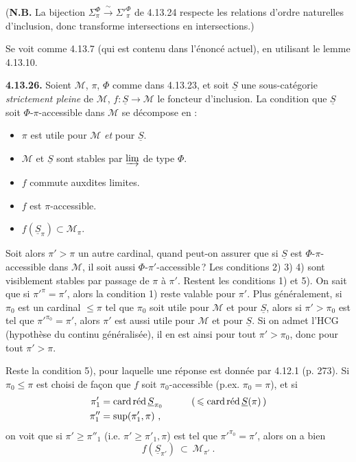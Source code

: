 \documentclass[11pt]{article}
\newcommand{\printedpage}[1]{\marginpar{\footnotesize p.~#1}}
\newcommand{\msp}[1]{\marginpar{\footnotesize [#1]}}
\newcommand{\cardred}{\mathop{\textup{card\,réd}}\nolimits}
\begin{document}
(\textbf{N.B.} La bijection $\Sigma^{\Phi}_{\pi}\xrightarrow{\ \sim\ }{\Sigma'}^{\Phi}_{\pi}$ de 4.13.24 respecte les relations d'ordre naturelles d'inclusion, donc transforme intersections en intersections.)

Se voit comme 4.13.7 (qui est contenu dans l'énoncé actuel), en utilisant le lemme 4.13.10.

\textbf{4.13.26.} Soient $\mathcal{M}$, $\pi$, $\Phi$ comme dans 4.13.23, et soit $\underline{S}$ une sous-catégorie \textit{strictement pleine} de $\mathcal{M}$, $f:\underline{S}\longrightarrow\mathcal{M}$ le foncteur d'inclusion. La condition que $\underline{S}$ soit $\Phi$-$\pi$-accessible dans $\mathcal{M}$ se décompose en :
\begin{itemize}[leftmargin=2.5em]
\item[1)] $\pi$ est utile pour $\mathcal{M}$ \textit{et} pour $\underline{S}$.
\item[2)] $\mathcal{M}$ et $\underline{S}$ sont stables par $\varinjlim$ de type $\Phi$.
\item[3)] $f$ commute auxdites limites.
\item[4)] $f$ est $\pi$-accessible.
\item[5)] $f(\underline{S}_\pi)\subset\mathcal{M}_\pi$.
\end{itemize}

\printedpage{132}
\msp{page 347}
Soit alors $\pi'>\pi$ un autre cardinal, quand peut-on assurer que si $\underline{S}$ est $\Phi$-$\pi$-accessible dans $\mathcal{M}$, il soit aussi $\Phi$-$\pi'$-accessible\,? Les conditions 2) 3) 4) sont visiblement stables par passage de $\pi$ à $\pi'$. Restent les conditions 1) et 5). On sait que si $\pi'^{\pi}=\pi'$, alors la condition 1) reste valable pour $\pi'$. Plus généralement, si $\pi_0$ est un cardinal $\leqslant\pi$ tel que $\pi_0$ soit utile pour $\mathcal{M}$ et pour $\underline{S}$, alors si $\pi'>\pi_0$ est tel que $\pi'^{\pi_0}=\pi'$, alors $\pi'$ est aussi utile pour $\mathcal{M}$ et pour $\underline{S}$. Si on admet l'HCG (hypothèse du continu généralisée), il en est ainsi pour tout $\pi'>\pi_0$, donc pour tout $\pi'>\pi$.

Reste la condition 5), pour laquelle une réponse est donnée par 4.12.1 (p. 273). Si $\pi_0\leqslant\pi$ est choisi de façon que $f$ soit $\pi_0$-accessible (p.ex. $\pi_0=\pi$), et si
\[
\begin{aligned}
\pi'_1 &= \cardred\underline{S}_{\pi_0} \qquad\quad (\,\leqslant\cardred\underline{S}(\pi)\,)\\
\pi''_1 &= \sup(\pi'_1,\pi)\ ,
\end{aligned}
\]
on voit que si $\pi'\geqslant\pi''_1$ (i.e. $\pi'\geqslant\pi'_1,\pi$) est tel que $\pi'^{\pi_0}=\pi'$, alors on a bien
\[ f(\underline{S}_{\pi'})\ \subset\ \mathcal{M}_{\pi'}\ . \]
\end{document}
